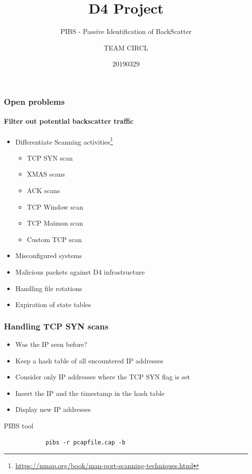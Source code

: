 \documentclass{beamer}
\title{D4 Project}
\subtitle{PIBS - Passive Identification of BackScatter}
\author{TEAM CIRCL}
\institute{Team CIRCL \\ \url{https://www.d4-project.org/}}
\date{20190329}
\begin{document}
    \begin{frame}
        \maketitle
    \end{frame}


\begin{frame}
    \frametitle{Open problems}
    \framesubtitle{Filter out potential backscatter traffic}
    \begin{itemize}
        \item Differentiate Scanning activities\footnote{\url{https://nmap.org/book/man-port-scanning-techniques.html}}
        \begin{itemize}
            \item TCP SYN scan
            \item XMAS scans
            \item ACK scans
            \item TCP Window scan
            \item TCP Maimon scan
            \item Custom TCP scan
        \end{itemize}
        \item Misconfigured systems
        \item Malicious packets against D4 infrastructure
	\item Handling file rotations
	\item Expiration of state tables
    \end{itemize}
\end{frame}


\begin{frame}[fragile]
    \frametitle{Handling TCP SYN scans}
    \begin{itemize}
        \item Was the IP seen before?
        \item Keep a hash table of all encountered IP addresses
        \item Consider only IP addresses where the TCP SYN flag is set
        \item Insert the IP and the timestamp in the hash table
        \item Display new IP addresses
    \end{itemize}
    \begin{block}{PIBS tool}
        \begin{verbatim}
            pibs -r pcapfile.cap -b
        \end{verbatim}
    \end{block}
\end{frame}
\end{document}
